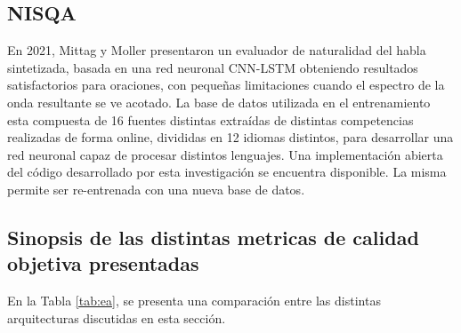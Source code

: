  \subsection{NISQA}
En 2021, Mittag y Moller \cite{mittag} presentaron un evaluador de naturalidad del habla sintetizada, basada en una red neuronal CNN-LSTM obteniendo resultados satisfactorios para oraciones, con pequeñas limitaciones cuando el espectro de la onda resultante se ve acotado. 
La base de datos utilizada en el entrenamiento esta compuesta de 16 fuentes distintas extraídas de distintas competencias realizadas de forma online, divididas en 12 idiomas distintos, para desarrollar una red neuronal capaz de procesar distintos lenguajes.
Una implementación abierta del código desarrollado por esta investigación se encuentra disponible. La misma permite ser re-entrenada con una nueva base de datos.

\subsection{Sinopsis de las distintas metricas de calidad objetiva presentadas}

En la Tabla \eqref{tab:ea}, se presenta una comparación entre las distintas arquitecturas discutidas en esta sección.

